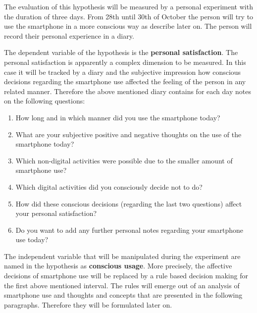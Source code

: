 The evaluation of this hypothesis will be measured by a personal experiment with the duration of three days. From 28th until 30th of October the person will try to use the smartphone in a more conscious way as describe later on. The person will record their personal experience in a diary. 

The dependent variable of the hypothesis is the \textbf{personal satisfaction}. The personal satisfaction is apparently a complex dimension to be measured. In this case it will be tracked by a diary and the subjective impression how conscious decisions regarding the smartphone use affected the feeling of the person in any related manner. Therefore the above mentioned diary contains for each day notes on the following questions:
\begin{enumerate}
\item 
How long and in which manner did you use the smartphone today?

\item
What are your subjective positive and negative thoughts on the use of the smartphone today?

\item
Which non-digital activities were possible due to the smaller amount of smartphone use?

\item
Which digital activities did you consciously decide not to do?

\item
How did these conscious decisions (regarding the last two questions) affect your personal satisfaction?

\item
Do you want to add any further personal notes regarding your smartphone use today?

\end{enumerate}

The independent variable that will be manipulated during the experiment are named in the hypothesis as \textbf{conscious usage}. More precisely, the affective decisions of smartphone use will be replaced by a rule based decision making for the first above mentioned interval. The rules will emerge out of an analysis of smartphone use and thoughts and concepts that are presented in the following paragraphs. Therefore they will be formulated later on.


